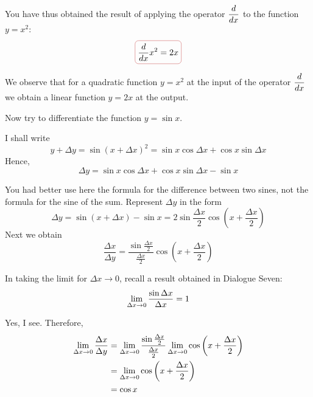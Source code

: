 \athr You have thus obtained the result of applying the operator $\dfrac{d}{dx}$ to the function $y = x^{2}$:
\begin{equation}%
\boxed{
\ddx x^{2} = 2x}
\label{deriv-quad}
\end{equation}

We observe that for a quadratic function  $y = x^{2}$ at the input of the operator $\dfrac{d}{dx}$ we obtain a linear function $y = 2x$ at the output. 

Now try to differentiate the function $y = \sin x$. 

\rdr I shall write
\begin{equation*}%
y + \Delta y = \sin(x + \Delta x)^{2} = \sin x \cos \Delta x + \cos x \sin \Delta x 
\end{equation*}
Hence,
\begin{equation*}%
\Delta y = \sin x \cos \Delta x + \cos x \sin \Delta x - \sin x
\end{equation*}

\athr You had better use here the formula for the difference between two sines, not the formula for the sine of the sum. Represent $\Delta y$ in the form
\begin{equation*}%
\Delta y =  \sin(x + \Delta x) - \sin x = 2 \sin \frac{\Delta x}{2} \cos \left( x + \frac{\Delta x}{2} \right)
\end{equation*}
Next we obtain
\begin{equation*}%
\frac{\Delta x}{\Delta y} = \dfrac{ \sin \frac{\Delta x}{2}}{\frac{\Delta x}{2}} \cos \left( x + \frac{\Delta x}{2} \right)
\end{equation*}

In taking the limit for $\Delta x \to 0$, recall a result obtained in Dialogue Seven:
\begin{equation*}%
\lmts{\Delta x}{0} \frac{\sin \Delta x}{\Delta x} =1 
\end{equation*}

\rdr Yes, I see. Therefore,
\begin{align*}%
\lmts{\Delta x}{0} \frac{\Delta x}{\Delta y} & = \lmts{\Delta x}{0} \dfrac{ \sin \frac{\Delta x}{2}}{\frac{\Delta x}{2}} \lmts{\Delta x}{0} \cos \left( x + \frac{\Delta x}{2} \right) \\
& = \lmts{\Delta x}{0} \cos \left( x + \frac{\Delta x}{2} \right) \\
& = \cos x
\end{align*}

